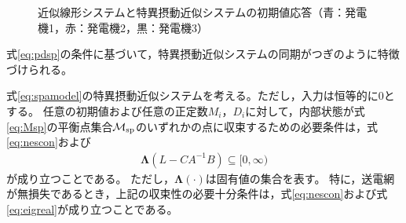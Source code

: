 \documentclass[tombow,dvipdfmx]{corona-a5}
\begin{document}
\begin{figure}[t]
{\begin{minipage}{0.32\linewidth}
  \end{minipage}
  \caption{近似線形システムと特異摂動近似システムの初期値応答（青：発電機1，赤：発電機2，黒：発電機3）}
  \label{fig:timeexsp}
  }
\end{figure}

式\ref{eq:pdsp}の条件に基づいて，特異摂動近似システムの同期がつぎのように特徴づけられる。

\begin{定理}[特異摂動近似システムの同期]\label{thm:2ndsys}
式\ref{eq:spamodel}の特異摂動近似システムを考える。ただし，入力は恒等的に0とする。
任意の初期値および任意の正定数$M_i$，$D_i$に対して，内部状態が式\ref{eq:Msp}の平衡点集合$\mathcal{M}_{\rm sp}$のいずれかの点に収束するための必要条件は，式\ref{eq:nescon}および
\begin{align}\label{eq:eigreal}
\bm{\Lambda}(L-CA^{-1}B)\subseteq [0,\infty)
\end{align}
が成り立つことである。
ただし，$\bm{\Lambda}(\cdot)$は固有値の集合を表す。
特に，送電網が無損失であるとき，上記の収束性の必要十分条件は，式\ref{eq:nescon}および式\ref{eq:eigreal}が成り立つことである。
\end{定理}
\end{document}
